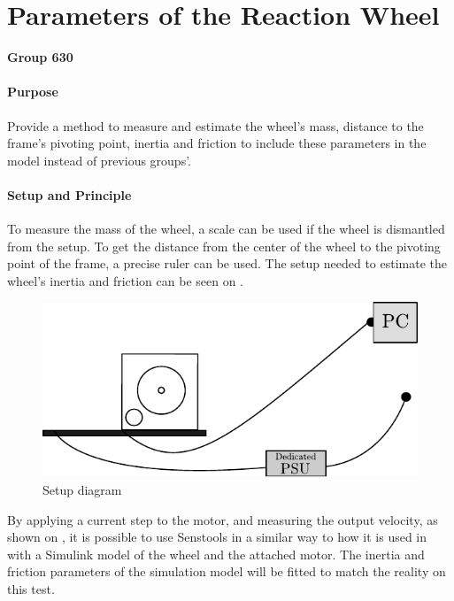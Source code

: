 \chapter{Parameters of the Reaction Wheel}\label{app:wheelParameters} 
\textbf{Group 630}

\subsubsection{Purpose}
Provide a method to measure and estimate the wheel's mass, distance to the frame's pivoting point, inertia and friction to include these parameters in the model instead of previous groups'.

\subsubsection{Setup and Principle}

To measure the mass of the wheel, a scale can be used if the wheel is dismantled from the setup. To get the distance from the center of the wheel to the pivoting point of the frame, a precise ruler can be used.
The setup needed to estimate the wheel's inertia and friction can be seen on .
\begin{figure}[H]
  \centering
  \includegraphics[scale=1]{figures/wheelParameterTestSetup}
  \caption{Setup diagram}
  \label{fig:wheelParameterTestSetup}
\end{figure}

By applying a current step to the motor, and measuring the output velocity, as shown on , it is possible to use Senstools in a similar way to how it is used in  with a Simulink model of the wheel and the attached motor. The inertia and friction parameters of the simulation model will be fitted to match the reality on this test.

